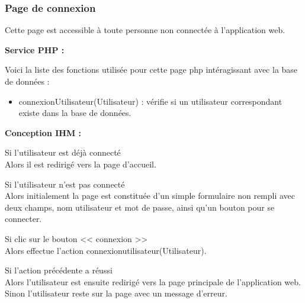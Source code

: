 		\subsubsection{Page de connexion}

			\begin{paragraphe}
				Cette page est accessible à toute personne non connectée à l'application web.
			\end{paragraphe}

			\begin{paragraphe}
				\textbf{Service PHP :}
			\end{paragraphe}

			\begin{paragraphe}
				Voici la liste des fonctions utilisée pour cette page php intéragissant avec la base de données :
				\begin{itemize}
					\item connexionUtilisateur(Utilisateur) : vérifie si un utilisateur correspondant existe dans la base de données.
				\end{itemize}
			\end{paragraphe}

			\begin{paragraphe}
				\textbf{Conception IHM :}
			\end{paragraphe}

			\begin{paragraphe}
				Si l'utilisateur est déjà connecté \\
				Alors il est redirigé vers la page d'accueil.
			\end{paragraphe}

			\begin{paragraphe}
				Si l'utilisateur n'est pas connecté \\
				Alors initialement la page est constituée d'un simple formulaire non rempli avec deux champs, nom utilisateur et mot de passe, ainsi qu'un bouton pour se connecter.
			\end{paragraphe}


			\begin{paragraphe}
				Si clic sur le bouton << connexion >> \\
				Alors effectue l'action connexionutilisateur(Utilisateur).
			\end{paragraphe}

			\begin{paragraphe}
				Si l'action précédente a réussi \\
				Alors l'utilisateur est ensuite redirigé vers la page principale de l'application web.
				Sinon l'utilisateur reste sur la page avec un message d'erreur.
			\end{paragraphe}

